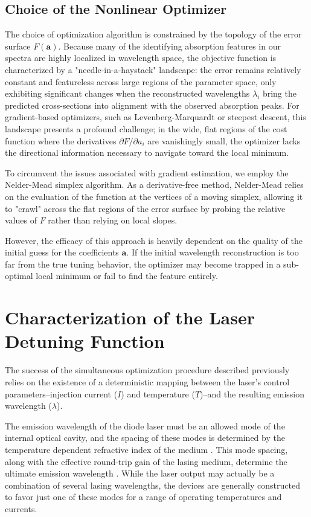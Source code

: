 \documentclass[12pt]{report}
\begin{document}
	\subsection{Choice of the Nonlinear Optimizer}
	The choice of optimization algorithm is constrained by the topology of the error surface $F(\mathbf{a})$. Because many of the identifying absorption features in our spectra are highly localized in wavelength space, the objective function is characterized by a "needle-in-a-haystack" landscape: the error remains relatively constant and featureless across large regions of the parameter space, only exhibiting significant changes when the reconstructed wavelengths $\lambda_i$ bring the predicted cross-sections into alignment with the observed absorption peaks. For gradient-based optimizers, such as Levenberg-Marquardt or steepest descent, this landscape presents a profound challenge; in the wide, flat regions of the cost function where the derivatives $\partial F/\partial a_i$ are vanishingly small, the optimizer lacks the directional information necessary to navigate toward the local minimum.
	
	To circumvent the issues associated with gradient estimation, we employ the Nelder-Mead simplex algorithm. As a derivative-free method, Nelder-Mead relies on the evaluation of the function at the vertices of a moving simplex, allowing it to "crawl" across the flat regions of the error surface by probing the relative values of $F$ rather than relying on local slopes. 
	
	However, the efficacy of this approach is heavily dependent on the quality of the initial guess for the coefficients $\mathbf{a}$. If the initial wavelength reconstruction is too far from the true tuning behavior, the optimizer may become trapped in a sub-optimal local minimum or fail to find the feature entirely.
	
	\section{Characterization of the Laser Detuning Function}
	
	The success of the simultaneous optimization procedure described previously relies on the existence of a deterministic mapping between the laser's control parameters--injection current ($I$) and temperature ($T$)--and the resulting emission wavelength ($\lambda$).
	
	The emission wavelength of the diode laser must be an allowed mode of the internal optical cavity, and the spacing of these modes is determined by the temperature dependent refractive index of the medium \cite{book_pankove1971}. This mode spacing, along with the effective round-trip gain of the lasing medium, determine the ultimate emission wavelength \cite{book_lasers_siegman}. While the laser output may actually be a combination of several lasing wavelengths, the devices are generally constructed to favor just one of these modes for a range of operating temperatures and currents. 
	
\end{document}
